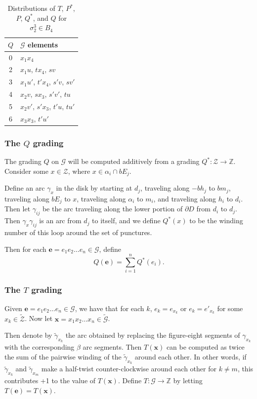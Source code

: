 \documentclass[11pt]{article}
\theoremstyle{plain} \newtheorem{thm}{Theorem}[subsection]
\theoremstyle{plain} \newtheorem{cor}[thm]{Corollary}
\theoremstyle{plain} \newtheorem{prop}[thm]{Proposition}
\theoremstyle{plain} \newtheorem{conj}[thm]{Conjecture}
\theoremstyle{plain} \newtheorem{lem}[thm]{Lemma}
\theoremstyle{definition} \newtheorem{df}[thm]{Definition}
\theoremstyle{remark} \newtheorem{rmk}[thm]{Remark}
\theoremstyle{remark} \newtheorem{obs}[thm]{Observation}
\newcommand{\B}[1]{B_{#1} }
\newcommand{\Ztil}{\tld{\mathcal{Z}}}
\newcommand{\Zcal}{\mathcal{Z}}
\newcommand{\G}{\mathcal{G}}
\newcommand{\tld}[1]{\widetilde{#1}}
\newcommand{\Gtil}{\tld{\mathcal{G}}}
\newcommand{\bx}{\mathbf{x}}
\newcommand{\be}{\mathbf{e}}
\newcommand{\Tspace}{\rule{0pt}{2.6ex}}
\newcommand{\Bspace}{\rule[-1.2ex]{0pt}{0pt}}
\begin{document}
\begin{table}[h!]
{\begin{tabular}{|c|l|}
\hline
\Tspace$Q$ \Bspace& $\G$ elements\\
\hline
\hline
0 & $x_{1}x_{4}$\\
\hline
2 & $x_{1}u$, $tx_{4}$, $sv$\\
\hline
3 & $x_{1}u'$, $t'x_{4}$, $s'v$, $sv'$\\
\hline
4 & $x_{2}v$, $sx_{3}$, $s'v'$, $tu$\\
\hline
5 & $x_{2}v'$, $s'x_{3}$, $t'u$, $tu'$\\
\hline
6 & $x_{3}x_{3}$, $t'u'$\\
\hline
\end{tabular}
}
\caption{Distributions of $T$, $P^{*}$, $P$, $Q^{*}$, and $Q$ for $\sigma_{2}^{3} \in \B{4}$}
\label{tab:QTP}
\end{table}

\subsubsection{The $Q$ grading}\label{sec:Qdef}

The grading $Q$ on $\G$ will be computed additively from a grading $Q^{*}:\Zcal \rightarrow \mathbb{Z}$.  Consider some $x \in \Zcal$, where $x \in \alpha_{i} \cap bE_{j}$.

Define an arc $\gamma_{x}$ in the disk by starting at $d _{j}$, traveling along $-bh_{j}$ to $bm_{j}$, traveling along $bE_{j}$ to $x$, traveling along $\alpha_{i}$ to $m_{i}$, and traveling along $h_{i}$ to $d_{i}$.  Then let $\gamma_{ij}$ be the arc traveling along the lower portion of $\partial D$ from $d_{i}$ to $d_{j}$.  Then $\gamma_{x}\gamma_{ij}$ is an arc from $d_{j}$ to itself, and we define $Q^{*}(x)$ to be the winding number of this loop around the set of punctures.

Then for each $\be =  e_{1} e_{2} \ldots e_{n}  \in \G$, define
\begin{equation*}
Q(\be) = \sum_{i = 1}^{n} Q^{*}(e_{i}).
\end{equation*}

\subsubsection{The $T$ grading}\label{sec:Tdef}
Given $\be = e_{1} e_{2} \ldots e_{n}  \in \G$, we have that for each $k$, $e_{k} = e_{x_{k}} \text{ or } e_{k}=e'_{x_{k}}$ for some $x_{k} \in \Ztil$.  Now let $\bx = x_{1} x_{2} \ldots x_{n} \in \Gtil$.

Then denote by $\tilde{\gamma}_{x_{k}}$  the arc obtained by replacing the figure-eight segments of $\gamma_{x_{k}}$ with the corresponding $\beta$ arc segments.  Then $T(\bx)$ can be computed as twice the sum of the pairwise winding of the $\tilde{\gamma}_{x_{k}}$ around each other.  In other words, if 
$\tilde{\gamma}_{x_{k}}$ and $\tilde{\gamma}_{x_{m}}$ make a half-twist counter-clockwise around each other for $k \neq m$, this contributes +1 to the value of $T(\bx)$.  Define $T:\G \rightarrow \mathbb{Z}$ by letting $T(\be) = T(\bx)$.
\end{document}
